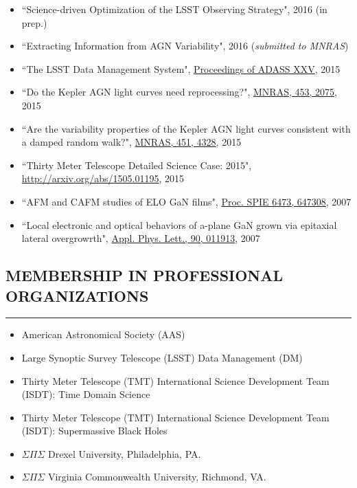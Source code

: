 \documentclass[10pt,a4]{article}
\newcounter{mySaveCounter}
\newcommand\myEnumReset{\setcounter{mySaveCounter}{0}}
\begin{document}
\begin{itemize}
	\item ``Science-driven Optimization of the LSST Observing Strategy", 2016 (in prep.)
	\item ``Extracting Information from AGN Variability", 2016 (\textit{submitted to MNRAS})
	\item ``The LSST Data Management System", \href{http://adsabs.harvard.edu/cgi-bin/bib_query?arXiv:1512.07914}{Proceedings of ADASS XXV}, 2015
	\item ``Do the Kepler AGN light curves need reprocessing?", \href{http://dx.doi.org/10.1093/mnras/stv1797}{MNRAS, 453, 2075}, 2015
	\item ``Are the variability properties of the Kepler AGN light curves consistent with a damped random walk?", \href{http://dx.doi.org/ 10.1093/mnras/stv1230}{MNRAS, 451, 4328}, 2015
	\item  ``Thirty Meter Telescope Detailed Science Case: 2015", \href{http://arxiv.org/abs/1505.01195}{http://arxiv.org/abs/1505.01195}, 2015
	\item  ``AFM and CAFM studies of ELO GaN films", \href{http://dx.doi.org/10.1117/12.706773}{Proc. SPIE 6473, 647308}, 2007
	\item ``Local electronic and optical behaviors of a-plane GaN grown via epitaxial lateral overgrowrth", \href{http://dx.doi.org/10.1063/1.2429901}{Appl. Phys. Lett., 90, 011913}, 2007
\end{itemize}

\myEnumReset 

\subsection*{MEMBERSHIP IN PROFESSIONAL ORGANIZATIONS}
\hrule  height 4pt
\vspace{0.2cm}

\begin{itemize}
	\item American Astronomical Society (AAS)
	\item Large Synoptic Survey Telescope (LSST) Data Management (DM)
	\item Thirty Meter Telescope (TMT) International Science Development Team (ISDT): Time Domain Science
	\item Thirty Meter Telescope (TMT) International Science Development Team (ISDT): Supermassive Black Holes
	\item $\Sigma \Pi \Sigma$ Drexel University, Philadelphia, PA.
	\item $\Sigma \Pi \Sigma$ Virginia Commonwealth University, Richmond, VA.
\end{itemize}
\end{document}
